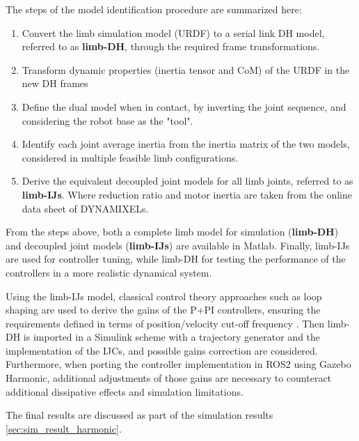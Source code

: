 The steps of the model identification procedure are summarized here: 
\begin{enumerate}
    \setlength\itemsep{-0.7em} 
    \item Convert the limb simulation model (URDF) to a serial link DH model, referred to as \textbf{limb-DH}, through the required frame transformations. 
    \item Transform dynamic properties (inertia tensor and CoM) of the URDF in the new DH frames
    \item Define the dual model when in contact, by inverting the joint sequence, and considering the robot base as the "tool". 
    \item Identify each joint average inertia from the inertia matrix of the two models, considered in multiple feasible limb configurations.
    \item Derive the equivalent decoupled joint models for all limb joints, referred to as \textbf{limb-IJs}. Where reduction ratio and motor inertia are taken from the online data sheet of DYNAMIXELs. 
\end{enumerate}

From the steps above, both a complete limb model for simulation  (\textbf{limb-DH}) and decoupled joint models (\textbf{limb-IJs}) are available in Matlab.
Finally, limb-IJs are used for controller tuning, while limb-DH for testing the performance of the controllers in a more realistic dynamical system. 

Using the limb-IJs model, classical control theory approaches such as loop shaping are used to derive the gains of the P+PI controllers, ensuring the requirements defined in terms of position/velocity cut-off frequency \cite{ControlTheory}. 
Then limb-DH is imported in a Simulink scheme with a trajectory generator and the implementation of the IJCs, and possible gains correction are considered. 
Furthermore, when porting the controller implementation in ROS2 using Gazebo Harmonic, additional adjustments of those gains are necessary to counteract additional dissipative effects and simulation limitations. 

The final results are discussed as part of the simulation results \ref{sec:sim_result_harmonic}. 









